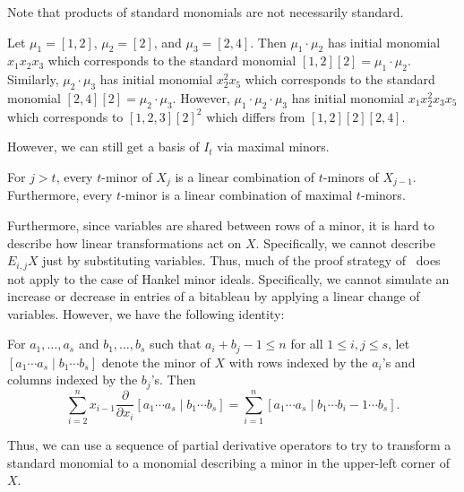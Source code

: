 \documentclass[letterpaper, 11pt]{amsart}
\begin{document}
Note that products of standard monomials are not necessarily standard.
\begin{ex}
  Let $\mu_1 = [1, 2]$, $\mu_2 = [2]$, and $\mu_3 = [2, 4]$.
  Then $\mu_1 \cdot \mu_2$ has initial monomial $x_1 x_2 x_3$ which corresponds to the standard monomial $[1, 2] [2] = \mu_1 \cdot \mu_2$.
  Similarly, $\mu_2 \cdot \mu_3$ has initial monomial $x_2^2 x_5$ which corresponds to the standard monomial $[2, 4] [2] = \mu_2 \cdot \mu_3$.
  However, $\mu_1 \cdot \mu_2 \cdot \mu_3$ has initial monomial $x_1 x_2^2 x_3 x_5$ which corresponds to $[1, 2, 3] [2]^2$ which differs from $[1, 2] [2] [2, 4]$.
\end{ex}
However, we can still get a basis of $I_t$ via maximal minors.
\begin{thrm}
  For $j > t$, every $t$-minor of $X_j$ is a linear combination of $t$-minors of $X_{j - 1}$.
  Furthermore, every $t$-minor is a linear combination of maximal $t$-minors.
\end{thrm}

Furthermore, since variables are shared between rows of a minor, it is hard to describe how linear transformations act on $X$.
Specifically, we cannot describe $E_{i, j} X$ just by substituting variables.
Thus, much of the proof strategy of~\cite{DG25} does not apply to the case of Hankel minor ideals.
Specifically, we cannot simulate an increase or decrease in entries of a bitableau by applying a linear change of variables.
However, we have the following identity:
\begin{lem}\label{lem:shift}
  For $a_1, \ldots, a_s$ and $b_1, \ldots, b_s$ such that $a_i + b_j - 1 \leq n$ for all $1 \leq i, j \leq s$, let $[a_1 \cdots a_s \mid b_1 \cdots b_s]$ denote the minor of $X$ with rows indexed by the $a_i$'s and columns indexed by the $b_j$'s.
  Then
  \[
    \sum_{i = 2}^n x_{i - 1} \frac{\partial}{\partial x_i} [a_1 \cdots a_s \mid b_1 \cdots b_s] = \sum_{i = 1}^n [a_1 \cdots a_s \mid b_1 \cdots b_i - 1 \cdots b_s].
  \]
\end{lem}
Thus, we can use a sequence of partial derivative operators to try to transform a standard monomial to a monomial describing a minor in the upper-left corner of $X$.
\end{document}
